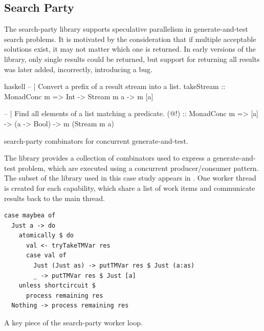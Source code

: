 \FloatBarrier

\subsection{Search Party}

The search-party\cite{search_party} library supports speculative
parallelism in generate-and-test search problems.  It is motivated by
the consideration that if multiple acceptable solutions exist, it may
not matter which one is returned.  In early versions of the library,
only single results could be returned, but support for returning all
results was later added, incorrectly, introducing a bug.

\begin{listing}
\centering
\begin{cminted}{haskell}
-- | Convert a prefix of a result stream into a list.
takeStream :: MonadConc m => Int -> Stream m a -> m [a]

-- | Find all elements of a list matching a predicate.
(@!) :: MonadConc m => [a] -> (a -> Bool) -> m (Stream m a)
\end{cminted}
\caption{search-party combinators for concurrent generate-and-test.}\label{lst:example-searchparty0}
\end{listing}

The library provides a collection of combinators used to express a
generate-and-test problem, which are executed using a concurrent
producer/consumer pattern.  The subset of the library used in this
case study appears in .  One worker
thread is created for each capability, which share a list of work
items and communicate results back to the main thread.

\begin{listing}
\centering
\begin{minipage}{0.5\textwidth}
\begin{verbatim}
case maybea of
  Just a -> do
    atomically $ do
      val <- tryTakeTMVar res
      case val of
        Just (Just as) -> putTMVar res $ Just (a:as)
        _ -> putTMVar res $ Just [a]
    unless shortcircuit $
      process remaining res
  Nothing -> process remaining res
\end{verbatim}
\end{minipage}
\caption{A key piece of the search-party worker loop.}\label{lst:example-searchparty1}
\end{listing}

